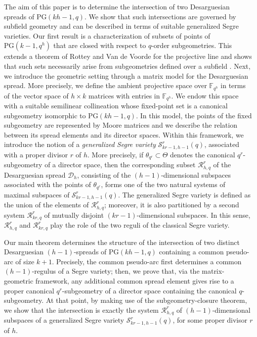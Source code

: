\documentclass[11pt]{article}
\theoremstyle{definition}
\numberwithin{equation}{section}
\def\cD{\mathcal D}
\def\cR{\mathcal R}
\def\cS{\mathcal S}
\def\PG{\mathrm{PG}}
\def\F{{\mathbb F}}
\begin{document}
The aim of this paper is to determine the intersection of two
Desarguesian spreads of $\PG(kh-1,q)$.
We show that such intersections are governed by subfield geometry and can be
described in terms of suitable generalized Segre varieties. Our first result is a characterization of subsets of points of
$\PG(k-1,q^h)$ that are closed with respect to $q$-order subgeometries.
This extends a theorem of Rottey and Van de Voorde for the projective line and
shows that such sets necessarily arise from subgeometries defined over a
subfield \cite{Rottey}. Next, we introduce the geometric setting through a matrix model for the Desarguesian spread. More precisely, we define the ambient projective space over $\F_{q^h}$ in terms of the vector space of $h\times k$
matrices with entries in $\F_{q^h}$. We endow this space with a suitable semilinear
collineation whose fixed-point set is a canonical subgeometry isomorphic to
$\PG(kh-1,q)$. In this model, the points of the fixed subgeometry are represented by Moore matrices and we describe the relation between its spread elements and its director
spaces. Within this framework, we introduce the notion of a \emph{generalized Segre
variety} $\mathcal S^r_{kr-1,h-1}(q)$, associated with a proper divisor $r$ of
$h$. More precisely, if $\theta_{q^r}\subset \Theta$ denotes the canonical
$q^r$-subgeometry of a director space, then the corresponding subset
$\cR^r_{h,q}$ of the Desarguesian spread $\cD_h$, consisting of the $(h-1)$-dimensional subspaces
associated with the points of $\theta_{q^r}$, forms one of the two natural
systems of maximal subspaces of $\mathcal S^r_{kr-1,h-1}(q)$. The generalized
Segre variety is defined as the union of the elements of $\cR^r_{h,q}$; moreover,
it is also partitioned by a second system $\cR^r_{kr,q}$ of mutually disjoint
$(kr-1)$-dimensional subspaces. In this sense, $\mathcal{R}^r_{h,q}$ and $\mathcal{R}^r_{kr,q}$ play the role of
the two reguli of the classical Segre variety.

Our main theorem determines the structure of the intersection of two distinct
Desarguesian $(h-1)$-spreads of $\PG(kh-1,q)$ containing a common pseudo-arc of
size $k+1$. Precisely, the common
pseudo-arc first determines a common $(h-1)$-regulus of a Segre variety; then, we prove that, via the matrix-geometric framework,  any additional common spread element gives rise to a proper
canonical $q^r$-subgeometry of a director space containing the canonical
$q$-subgeometry. At that point, by making use of
the subgeometry-closure theorem,
we show that the intersection is exactly the system $\cR^r_{h,q}$ of $(h-1)$-dimensional subspaces
of a generalized Segre variety $\cS^r_{kr-1,h-1}(q)$, for some proper divisor
$r$ of $h$.
\end{document}
